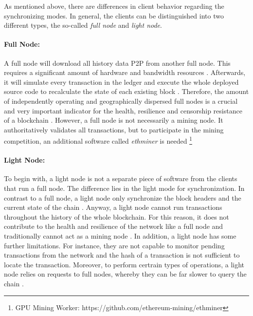 As mentioned above, there are differences in client behavior regarding the synchronizing modes. 
In general, the clients can be distinguished into two different types, the so-called \textit{full node} and 
\textit{light node}. 

\paragraph{Full Node:} A full node will download all history data P2P from
another full node. This requires a significant amount of hardware and bandwidth resources .
Afterwards, it will simulate every transaction in the ledger
and execute the whole deployed source code to recalculate the state of each existing block .
Therefore, the amount of independently operating and geographically dispersed full nodes 
is a crucial and very important indicator for the health, resilience and 
censorship resistance of a blockchain . 
However, a full node is not necessarily a mining node. It authoritatively validates all transactions, but 
to participate in the mining competition, an additional software called \textit{ethminer}
 is needed \footnote{GPU Mining Worker: https://github.com/ethereum-mining/ethminer}

\paragraph{Light Node:} To begin with, a light node is not a separate piece of software from the clients that 
run a full node. The difference lies in the light mode for synchronization. 
In contrast to a full node, a light node only synchronize the block headers and the 
current state of the chain .
Anyway, a light node cannot run transactions throughout the history of the 
whole blockchain. For this reason, it does not contribute to the health and resilience of 
the network like a full node and traditionally cannot act as a mining node . 
In addition, a light node has some further limitations. For instance, they are not 
capable to monitor pending transactions from the network and the hash of a transaction
is not sufficient to locate the transaction. Moreover, to perform certrain types of operations,
a light node relies on requests to full nodes, whereby they can be far slower to query the chain .


